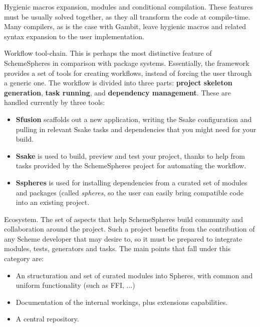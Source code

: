 \documentclass{acm_proc_article-sp}
\begin{document}
\begin{description}
  \item Hygienic macros expansion, modules and conditional compilation.
These features must be usually solved together, as they all transform the code at compile-time. Many compilers, as is the case with Gambit, leave hygienic macros and related syntax expansion to the user implementation.

  \item Workflow tool-chain.
    This is perhaps the most distinctive feature of SchemeSpheres in comparison with package systems. Essentially, the framework provides a set of tools for creating workflows, instead of forcing the user through a generic one. The workflow is divided into three parts: \textbf{project skeleton generation}, \textbf{task running}, and \textbf{dependency management}. These are handled currently by three tools:
    \begin{itemize}
      \item \textbf{Sfusion} scaffolds out a new application, writing the Ssake configuration and pulling in relevant Ssake tasks and dependencies that you might need for your build.
      \item \textbf{Ssake} is used to build, preview and test your project, thanks to help from tasks provided by the SchemeSpheres project for automating the workflow.
      \item \textbf{Sspheres} is used for installing dependencies from a curated set of modules and packages (called \textit{spheres}, so the user can easily bring compatible code into an existing project.
    \end{itemize}

  \item Ecosystem.
The set of aspects that help SchemeSpheres build community and collaboration around the project. Such a project benefits from the contribution of any Scheme developer that may desire to, so it must be prepared to integrate modules, tests, generators and tasks. The main points that fall under this category are:
    \begin{itemize}
      \item An structuration and set of curated modules into Spheres, with common and uniform functionality (such as FFI, ...)
      \item Documentation of the internal workings, plus extensions capabilities.
      \item A central repository.
    \end{itemize}
\end{description}
\end{document}
